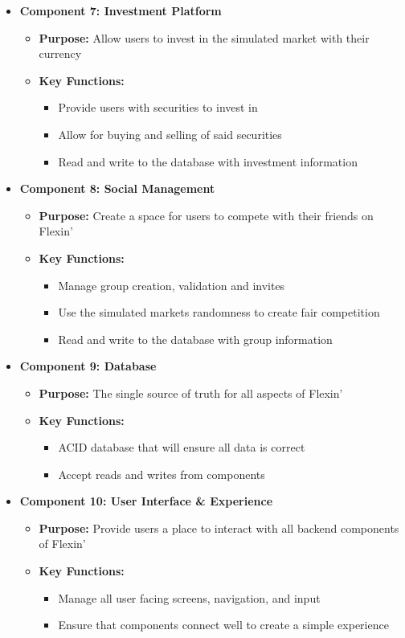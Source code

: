 \documentclass{article}
\begin{document}
\begin{itemize}
    \item \textbf{Component 7: Investment Platform}
    \begin{itemize}
        \item \textbf{Purpose:} Allow users to invest in the simulated market with their currency
        \item \textbf{Key Functions:}
        \begin{itemize}
            \item Provide users with securities to invest in
            \item Allow for buying and selling of said securities
            \item Read and write to the database with investment information
        \end{itemize}
    \end{itemize}
    \item \textbf{Component 8: Social Management}
    \begin{itemize}
        \item \textbf{Purpose:} Create a space for users to compete with their friends on Flexin'
        \item \textbf{Key Functions:}
        \begin{itemize}
            \item Manage group creation, validation and invites
            \item Use the simulated markets randomness to create fair competition
            \item Read and write to the database with group information
        \end{itemize}
    \end{itemize}
    \item \textbf{Component 9: Database}
    \begin{itemize}
        \item \textbf{Purpose:} The single source of truth for all aspects of Flexin'
        \item \textbf{Key Functions:}
        \begin{itemize}
            \item ACID database that will ensure all data is correct
            \item Accept reads and writes from components
        \end{itemize}
    \end{itemize}
    \item \textbf{Component 10: User Interface \& Experience}
    \begin{itemize}
        \item \textbf{Purpose:} Provide users a place to interact with all backend components of Flexin'
        \item \textbf{Key Functions:}
        \begin{itemize}
            \item Manage all user facing screens, navigation, and input
            \item Ensure that components connect well to create a simple experience
        \end{itemize}
    \end{itemize}
\end{itemize}
\end{document}
